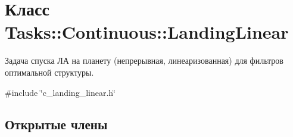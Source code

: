 \hypertarget{class_tasks_1_1_continuous_1_1_landing_linear}{}\section{Класс Tasks\+:\+:Continuous\+:\+:Landing\+Linear}
\label{class_tasks_1_1_continuous_1_1_landing_linear}


Задача спуска ЛА на планету (непрерывная, линеаризованная) для фильтров оптимальной структуры.  




{\ttfamily \#include \char`\"{}c\+\_\+landing\+\_\+linear.\+h\char`\"{}}

\subsection*{Открытые члены}
